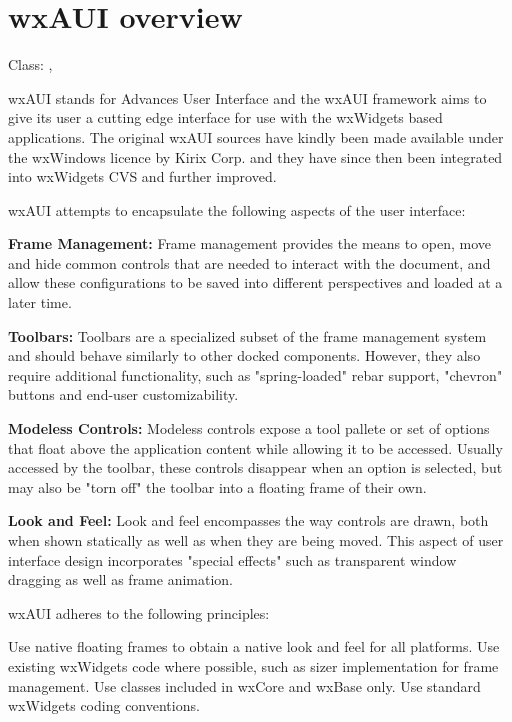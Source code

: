\section{wxAUI overview}\label{wxauioverview}

Class: , 

wxAUI stands for Advances User Interface and the wxAUI framework
aims to give its user a cutting edge interface for use with the
wxWidgets based applications. The original wxAUI sources have
kindly been made available under the wxWindows licence
by Kirix Corp. and they have since then been integrated into
wxWidgets CVS and further improved.

wxAUI attempts to encapsulate the following aspects of the user interface:

{\bf Frame Management:}
Frame management provides the means to open, move and hide common
controls that are needed to interact with the document, and allow these
configurations to be saved into different perspectives and loaded at a
later time.

{\bf Toolbars:}
Toolbars are a specialized subset of the frame management system and
should behave similarly to other docked components. However, they also
require additional functionality, such as "spring-loaded" rebar support,
"chevron" buttons and end-user customizability.

{\bf Modeless Controls:}
Modeless controls expose a tool pallete or set of options that float
above the application content while allowing it to be accessed. Usually
accessed by the toolbar, these controls disappear when an option is
selected, but may also be "torn off" the toolbar into a floating frame
of their own.

{\bf Look and Feel:}
Look and feel encompasses the way controls are drawn, both when shown
statically as well as when they are being moved. This aspect of user
interface design incorporates "special effects" such as transparent
window dragging as well as frame animation.

wxAUI adheres to the following principles:

Use native floating frames to obtain a native look and feel for all
platforms. Use existing wxWidgets code where possible, such as sizer
implementation for frame management. Use classes included in wxCore
and wxBase only. Use standard wxWidgets coding conventions. 

